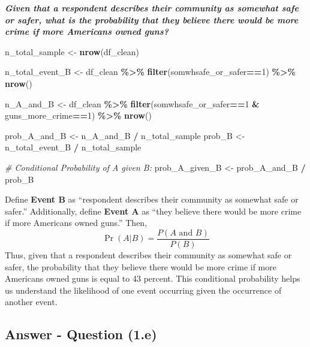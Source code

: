 \documentclass[
  11pt,
]{article}
\newenvironment{Shaded}{\begin{snugshade}}{\end{snugshade}}
\newcommand{\CommentTok}[1]{\textcolor[rgb]{0.56,0.35,0.01}{\textit{#1}}}
\newcommand{\DecValTok}[1]{\textcolor[rgb]{0.00,0.00,0.81}{#1}}
\newcommand{\FunctionTok}[1]{\textcolor[rgb]{0.13,0.29,0.53}{\textbf{#1}}}
\newcommand{\NormalTok}[1]{#1}
\newcommand{\OtherTok}[1]{\textcolor[rgb]{0.56,0.35,0.01}{#1}}
\newcommand{\SpecialCharTok}[1]{\textcolor[rgb]{0.81,0.36,0.00}{\textbf{#1}}}
\begin{document}
\textbf{\emph{Given that a respondent describes their community as
somewhat safe or safer, what is the probability that they believe there
would be more crime if more Americans owned guns?}}

\begin{Shaded}
\begin{Highlighting}[]
\NormalTok{n\_total\_sample }\OtherTok{\textless{}{-}} \FunctionTok{nrow}\NormalTok{(df\_clean)}

\NormalTok{n\_total\_event\_B }\OtherTok{\textless{}{-}}\NormalTok{ df\_clean }\SpecialCharTok{\%\textgreater{}\%}
  \FunctionTok{filter}\NormalTok{(somwhsafe\_or\_safer}\SpecialCharTok{==}\DecValTok{1}\NormalTok{) }\SpecialCharTok{\%\textgreater{}\%}
  \FunctionTok{nrow}\NormalTok{()}

\NormalTok{n\_A\_and\_B }\OtherTok{\textless{}{-}}\NormalTok{ df\_clean }\SpecialCharTok{\%\textgreater{}\%}
  \FunctionTok{filter}\NormalTok{(somwhsafe\_or\_safer}\SpecialCharTok{==}\DecValTok{1} \SpecialCharTok{\&}\NormalTok{ guns\_more\_crime}\SpecialCharTok{==}\DecValTok{1}\NormalTok{) }\SpecialCharTok{\%\textgreater{}\%}
  \FunctionTok{nrow}\NormalTok{()}

\NormalTok{prob\_A\_and\_B }\OtherTok{\textless{}{-}}\NormalTok{ n\_A\_and\_B }\SpecialCharTok{/}\NormalTok{ n\_total\_sample}
\NormalTok{prob\_B }\OtherTok{\textless{}{-}}\NormalTok{ n\_total\_event\_B }\SpecialCharTok{/}\NormalTok{ n\_total\_sample}

\CommentTok{\# Conditional Probability of A given B:}
\NormalTok{prob\_A\_given\_B }\OtherTok{\textless{}{-}}\NormalTok{ prob\_A\_and\_B }\SpecialCharTok{/}\NormalTok{ prob\_B}
\end{Highlighting}
\end{Shaded}

Define \textbf{Event B} as ``respondent describes their community as
somewhat safe or safer.'' Additionally, define \textbf{Event A} as
``they believe there would be more crime if more Americans owned guns.''
Then, \[\Pr(A | B) = \frac{P(A\text{ and }B)}{P(B)}\] Thus, given that a
respondent describes their community as somewhat safe or safer, the
probability that they believe there would be more crime if more
Americans owned guns is equal to 43 percent. This conditional
probability helps us understand the likelihood of one event occurring
given the occurrence of another event.

\subsection{Answer - Question (1.e)}\label{answer---question-1.e}
\end{document}
